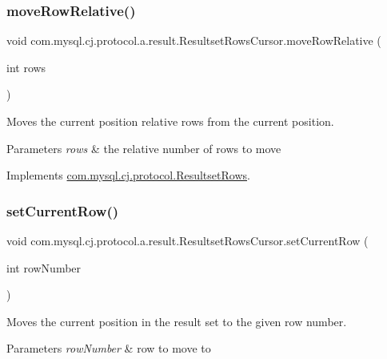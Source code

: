 \subsubsection{\texorpdfstring{move\+Row\+Relative()}{moveRowRelative()}}
{\footnotesize\ttfamily void com.\+mysql.\+cj.\+protocol.\+a.\+result.\+Resultset\+Rows\+Cursor.\+move\+Row\+Relative (\begin{DoxyParamCaption}\item[{int}]{rows }\end{DoxyParamCaption})}

Moves the current position relative \textquotesingle{}rows\textquotesingle{} from the current position.


\begin{DoxyParams}{Parameters}
{\em rows} & the relative number of rows to move \\
\hline
\end{DoxyParams}


Implements \mbox{\hyperlink{interfacecom_1_1mysql_1_1cj_1_1protocol_1_1_resultset_rows_a81d7635ad38c59a3160e3edc46327bac}{com.\+mysql.\+cj.\+protocol.\+Resultset\+Rows}}.

\mbox{\label{classcom_1_1mysql_1_1cj_1_1protocol_1_1a_1_1result_1_1_resultset_rows_cursor_aab53d9374408ceaf15369f0b515ab56e}} 
\subsubsection{\texorpdfstring{set\+Current\+Row()}{setCurrentRow()}}
{\footnotesize\ttfamily void com.\+mysql.\+cj.\+protocol.\+a.\+result.\+Resultset\+Rows\+Cursor.\+set\+Current\+Row (\begin{DoxyParamCaption}\item[{int}]{row\+Number }\end{DoxyParamCaption})}

Moves the current position in the result set to the given row number.


\begin{DoxyParams}{Parameters}
{\em row\+Number} & row to move to \\
\hline
\end{DoxyParams}


